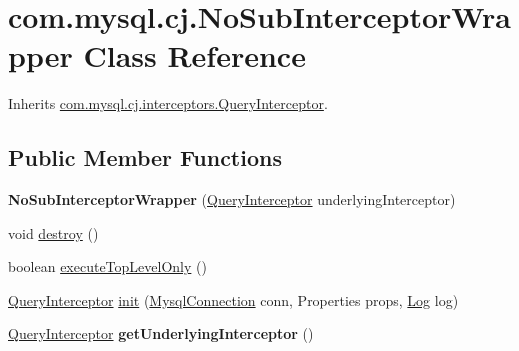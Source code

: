 \hypertarget{classcom_1_1mysql_1_1cj_1_1_no_sub_interceptor_wrapper}{}\section{com.\+mysql.\+cj.\+No\+Sub\+Interceptor\+Wrapper Class Reference}
\label{classcom_1_1mysql_1_1cj_1_1_no_sub_interceptor_wrapper}


Inherits \mbox{\hyperlink{interfacecom_1_1mysql_1_1cj_1_1interceptors_1_1_query_interceptor}{com.\+mysql.\+cj.\+interceptors.\+Query\+Interceptor}}.

\subsection*{Public Member Functions}
\begin{DoxyCompactItemize}
\item 
\mbox{\label{classcom_1_1mysql_1_1cj_1_1_no_sub_interceptor_wrapper_a16d59d2656f58460d8d986caf02508ff}} 
{\bfseries No\+Sub\+Interceptor\+Wrapper} (\mbox{\hyperlink{interfacecom_1_1mysql_1_1cj_1_1interceptors_1_1_query_interceptor}{Query\+Interceptor}} underlying\+Interceptor)
\item 
void \mbox{\hyperlink{classcom_1_1mysql_1_1cj_1_1_no_sub_interceptor_wrapper_a196b252abd96fbdd70d0dd6f844145b8}{destroy}} ()
\item 
boolean \mbox{\hyperlink{classcom_1_1mysql_1_1cj_1_1_no_sub_interceptor_wrapper_a84d3030e0055b60ed0bb2b56fd5a0dbe}{execute\+Top\+Level\+Only}} ()
\item 
\mbox{\hyperlink{interfacecom_1_1mysql_1_1cj_1_1interceptors_1_1_query_interceptor}{Query\+Interceptor}} \mbox{\hyperlink{classcom_1_1mysql_1_1cj_1_1_no_sub_interceptor_wrapper_a1d037e783990bcd80c1ce5a16a1cf254}{init}} (\mbox{\hyperlink{interfacecom_1_1mysql_1_1cj_1_1_mysql_connection}{Mysql\+Connection}} conn, Properties props, \mbox{\hyperlink{interfacecom_1_1mysql_1_1cj_1_1log_1_1_log}{Log}} log)
\item 
\mbox{\label{classcom_1_1mysql_1_1cj_1_1_no_sub_interceptor_wrapper_ab3778df7a64125bbc4121fa747c6b5a4}} 
\mbox{\hyperlink{interfacecom_1_1mysql_1_1cj_1_1interceptors_1_1_query_interceptor}{Query\+Interceptor}} {\bfseries get\+Underlying\+Interceptor} ()
\end{DoxyCompactItemize}


